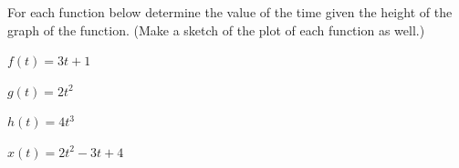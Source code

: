 \begin{problem}
\item For each function below determine the value of the time given
  the height of the graph of the function. (Make a sketch of the plot
  of each function as well.)

  \begin{subproblem}
  \item $f(t)=3t+1$
    \vfill
  \item $g(t)=2t^2$
    \vfill
  \item $h(t)=4t^3$
    \vfill
  \item $x(t)=2t^2 - 3t + 4$
    \vfill
  \end{subproblem}


  \vfill

\end{problem}





